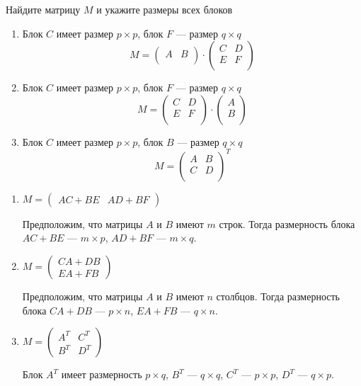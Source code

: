 \begin{problem}
Найдите матрицу $M$ и укажите размеры всех блоков
\begin{enumerate}
  \item Блок $C$ имеет размер $p\times p$, блок $F$ — размер $q\times q$
    \[M=\begin{pmatrix}
      A & B \\
    \end{pmatrix} \cdot
    \begin{pmatrix}
      C & D \\
      E & F \\
    \end{pmatrix}
  \]
\item Блок $C$ имеет размер $p\times p$, блок $F$ — размер $q\times q$
  \[
    M=\begin{pmatrix}
      C & D \\
      E & F \\
    \end{pmatrix}\cdot
    \begin{pmatrix}
      A \\
      B \\
    \end{pmatrix}
  \]
  \item Блок $C$ имеет размер $p\times p$, блок $B$ — размер $q\times q$
    \[
      M=\begin{pmatrix}
      A & B \\
      C & D \\
    \end{pmatrix}^T
  \]

\end{enumerate}

\begin{sol}
\begin{enumerate}
\item $M = \begin{pmatrix}
AC + BE & AD + BF
\end{pmatrix}
$

Предположим, что матрицы $A$ и $B$ имеют $m$ строк.
Тогда размерность блока $AC + BE$ — $m \times p$, $AD + BF$ — $m \times q$.
\item $M = \begin{pmatrix}
CA + DB \\
EA + FB
\end{pmatrix}
$

Предположим, что матрицы $A$ и $B$ имеют $n$ столбцов.
Тогда размерность блока $CA + DB$ — $p \times n$, $EA + FB$ — $q \times n$.
\item $M = \begin{pmatrix}
A^T & C^T \\
B^T & D^T
\end{pmatrix}
$

Блок $A^T$ имеет размерность $p \times q$, $B^T$ — $q \times q$, $C^T$ — $p \times p$, $D^T$ — $q \times p$.
\end{enumerate}
\end{sol}
\end{problem}

